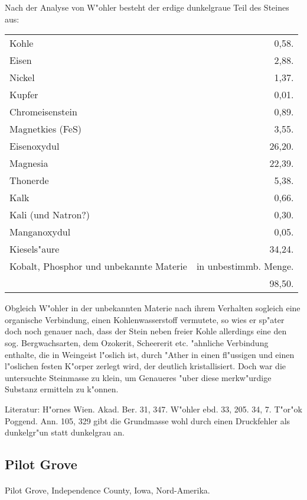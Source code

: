 \documentclass[a4paper, 11pt, oneside]{article}
\begin{document}
Nach der Analyse von W"ohler besteht der erdige dunkelgraue Teil des Steines aus:

\begin{table}[H]
    \centering
    \begin{tabular}{l r}
        Kohle & 0,58. \\
        Eisen & 2,88. \\
        Nickel & 1,37. \\
        Kupfer & 0,01. \\
        Chromeisenstein & 0,89. \\
        Magnetkies (FeS) & 3,55. \\
        Eisenoxydul & 26,20. \\
        Magnesia & 22,39. \\
        Thonerde & 5,38. \\
        Kalk & 0,66. \\
        Kali (und Natron?)  & 0,30. \\
        Manganoxydul & 0,05. \\
        Kiesels"aure & 34,24. \\
        Kobalt, Phosphor und unbekannte Materie & in unbestimmb. Menge.  \\
         & 98,50. \\
    \end{tabular}
\end{table}

Obgleich W"ohler in der unbekannten Materie nach ihrem Verhalten sogleich eine organische Verbindung, einen Kohlenwasserstoff vermutete, so wies er sp"ater doch noch genauer nach, dass der Stein neben freier Kohle allerdings eine den sog. Bergwachsarten, dem Ozokerit, Scheererit etc. "ahnliche Verbindung enthalte, die in Weingeist l"oslich ist, durch "Ather in einen fl"ussigen und einen l"oslichen festen K"orper zerlegt wird, der deutlich kristallisiert. Doch war die untersuchte Steinmasse zu klein, um Genaueres "uber diese merkw"urdige Substanz ermitteln zu k"onnen.

\footnotesize
Literatur: H"ornes Wien. Akad. Ber. 31, 347. W"ohler ebd. 33, 205. 34, 7. T"or"ok Poggend. Ann. 105, 329 gibt die Grundmasse wohl durch einen Druckfehler als dunkelgr"un statt dunkelgrau an.

\subsection{Pilot Grove}
\normalsize
\paragraph{}
Pilot Grove, Independence County, Iowa, Nord-Amerika.
\end{document}
